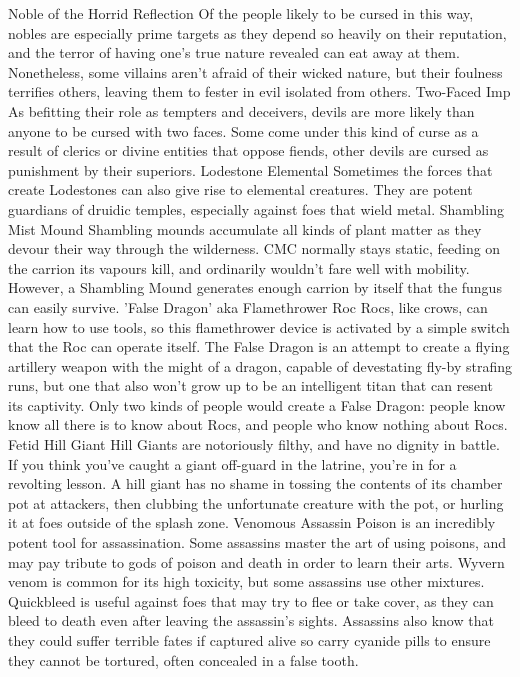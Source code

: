 \documentclass[10pt,a4paper,twoside,twocolumn,openany,bg=print,nodeprecatedcode]{dndbook}
\begin{document}
Noble of the Horrid Reflection
Of the people likely to be cursed in this way, nobles are especially prime targets as they depend so heavily on their reputation, and the terror of having one's true nature revealed can eat away at them. Nonetheless, some villains aren't afraid of their wicked nature, but their foulness terrifies others, leaving them to fester in evil isolated from others.
Two-Faced Imp
As befitting their role as tempters and deceivers, devils are more likely than anyone to be cursed with two faces. Some come under this kind of curse as a result of clerics or divine entities that oppose fiends, other devils are cursed as punishment by their superiors.
Lodestone Elemental
Sometimes the forces that create  Lodestones can also give rise to elemental creatures. They are potent guardians of druidic temples, especially against foes that wield metal.
Shambling Mist Mound
Shambling mounds accumulate all kinds of plant matter as they devour their way through the wilderness. CMC normally stays static, feeding on the carrion its vapours kill, and ordinarily wouldn't fare well with mobility. However, a Shambling Mound generates enough carrion by itself that the fungus can easily survive.
'False Dragon' aka Flamethrower Roc
Rocs, like crows, can learn how to use tools, so this flamethrower device is activated by a simple switch that the Roc can operate itself. The False Dragon is an attempt to create a flying artillery weapon with the might of a dragon, capable of devestating fly-by strafing runs, but one that also won't grow up to be an intelligent titan that can resent its captivity. Only two kinds of people would create a False Dragon: people know know all there is to know about Rocs, and people who know nothing about Rocs.
Fetid Hill Giant
Hill Giants are notoriously filthy, and have no dignity in battle. If you think you've caught a giant off-guard in the latrine, you're in for a revolting lesson. A hill giant has no shame in tossing the contents of its chamber pot at attackers, then clubbing the unfortunate creature with the pot, or hurling it at foes outside of the splash zone.
Venomous Assassin
Poison is an incredibly potent tool for assassination. Some assassins master the art of using poisons, and may pay tribute to gods of poison and death in order to learn their arts. Wyvern venom is common for its high toxicity, but some assassins use other mixtures. Quickbleed is useful against foes that may try to flee or take cover, as they can bleed to death even after leaving the assassin's sights. Assassins also know that they could suffer terrible fates if captured alive so carry cyanide pills to ensure they cannot be tortured, often concealed in a false tooth. 
\end{document}
